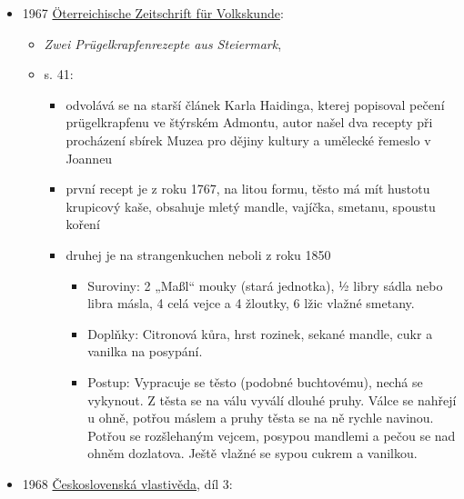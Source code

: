 \begin{itemize}
  \begin{itemize}
  \tightlist
  \item
  \item
    Los Angeles: Křesťanská akademie, 1967
  \item
    není online
  \item
    s. 285: trdelníky, které nebožka tetinka dovedla mistrně vyrobit, a
    výbornou vánočku. Dárky za mé mladosti se nedávaly, ty roznášel
  \item
    vzpomíná na dětství v Kobeřicích na Hané
  \item
    o Vánocích mívali trdelníky, které uměla tetinka vyrobit
  \end{itemize}
\item
  1967
  \href{https://volkskundemuseum.at/jart/prj3/volkskundemuseum/data/uploads/downloads/OeZV_Volltexte/OEZV_1967.pdf}{Öterreichische
  Zeitschrift für Volkskunde}:

  \begin{itemize}
  \tightlist
  \item
    \emph{Zwei Prügelkrapfenrezepte aus Steiermark},
     
  \item
    s. 41:

    \begin{itemize}
    \tightlist
    \item
      odvolává se na starší článek Karla Haidinga, kterej popisoval
      pečení prügelkrapfenu ve štýrském Admontu, autor našel dva recepty
      při procházení sbírek Muzea pro dějiny kultury a umělecké řemeslo
      v Joanneu
    \item
      první recept je z roku 1767, na litou formu, těsto má mít hustotu
      krupicový kaše, obsahuje mletý mandle, vajíčka, smetanu, spoustu
      koření
    \item
      druhej je na strangenkuchen neboli  z roku
      1850

      \begin{itemize}
      \tightlist
      \item
        Suroviny: 2 „Maßl`` mouky (stará jednotka), ½ libry sádla nebo
        libra másla, 4 celá vejce a 4 žloutky, 6 lžic vlažné smetany.
      \item
        Doplňky: Citronová kůra, hrst rozinek, sekané mandle, cukr a
        vanilka na posypání.
      \item
        Postup: Vypracuje se těsto (podobné buchtovému), nechá se
        vykynout. Z těsta se na válu vyválí dlouhé pruhy. Válce se
        nahřejí u ohně, potřou máslem a pruhy těsta se na ně rychle
        navinou. Potřou se rozšlehaným vejcem, posypou mandlemi a pečou
        se nad ohněm dozlatova. Ještě vlažné se sypou cukrem a vanilkou.
      \end{itemize}
    \end{itemize}
  \end{itemize}
\item
  1968
  \href{https://ndk.cz/view/uuid:86449e60-654c-11e2-9d9f-005056827e52?page=uuid\%3A7c5078bd258a6084e96ff7134ee24101}{Československá
  vlastivěda}, díl 3:


\end{itemize}
